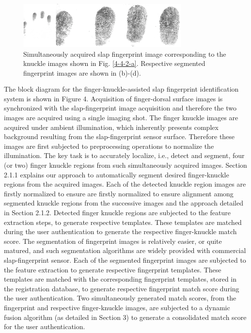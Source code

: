 \begin{figure}[!ht]
    \centering
    \includegraphics[width=3.4in]{Figures/4-4-2-fingerprint.png}
    \caption{Simultaneously acquired slap fingerprint image corresponding to the knuckle images shown in Fig. \ref{4-4-2-a}. Respective segmented fingerprint images are shown in (b)-(d).}
    \label{capture-finerprint}
\end{figure}

The block diagram for the finger-knuckle-assisted slap fingerprint identification system is shown in Figure 4. Acquisition of finger-dorsal surface images is synchronized with the slap-fingerprint image acquisition and therefore the two images are acquired using a single imaging shot. The finger knuckle images are acquired under ambient illumination, which inherently presents complex background resulting from the slap-fingerprint sensor surface. Therefore these images are first subjected to preprocessing operations to normalize the illumination. The key task is to accurately localize, i.e., detect and segment, four (or two) finger knuckle regions from such simultaneously acquired images. Section 2.1.1 explains our approach to automatically segment desired finger-knuckle regions from the acquired images. Each   of   the   detected   knuckle   region   images  are  firstly normalized to ensure are  firstly normalized to ensure alignment among segmented knuckle regions from the successive images and the approach detailed in Section 2.1.2. Detected finger knuckle regions are subjected to the feature extraction steps, to generate respective templates. These templates are matched during the user authentication to generate the respective finger-knuckle match score. The segmentation of fingerprint images is relatively easier, or quite matured, and such segmentation algorithms are widely provided with commercial slap-fingerprint sensor. Each of the segmented fingerprint images are subjected to the feature extraction to generate respective fingerprint templates. These templates are matched with the corresponding fingerprint templates, stored in the registration database, to generate respective fingerprint match score during the user authentication. Two simultaneously generated match scores, from the fingerprint and respective finger-knuckle images, are subjected to a dynamic fusion algorithm (as detailed in Section 3) to generate a consolidated match score for the user authentication.   


